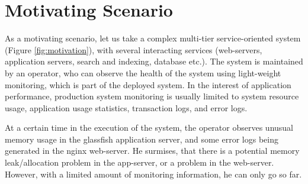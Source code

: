 \section{Motivating Scenario}
\label{sec:motivation}

\noindent
As a motivating scenario, let us take a complex multi-tier service-oriented system (Figure \ref{fig:motivation}), with several interacting services (web-servers, application servers, search and indexing, database etc.). 
The system is maintained by an operator, who can observe the health of the system using light-weight monitoring, which is part of the deployed system.
In the interest of application performance, production system monitoring is usually limited to system resource usage, application usage statistics, transaction logs, and error logs.

At a certain time in the execution of the system, the operator observes unusual memory usage in the glassfish application server, and some error logs being generated in the nginx web-server. 
He surmises, that there is a potential memory leak/allocation problem in the app-server, or a problem in the web-server.
However, with a limited amount of monitoring information, he can only go so far.

\iffalse
user Joe who is an administrator for a multi-tiered system (see Figure \ref{fig:motivation}). 
Much like several administrators, Joe uses light-weight system instrumentation to get a high level statistical/health view of the system.
He observes an unusually high memory usage in the glassfish server for transaction type X, and some anomalous error logs in the associated nginx systems.
Under usual circumstances, the system would have to go down(depending on the severity of the problem), the problem debugged using offline analysis, and the system would be patched once the problem has been diagnosed. 
However often, it is difficult to find out the configuration of the system, and the user input which is causing this problem.
In modern large scale systems some errors may happen only at scale, and would require a large test-cluster to recreate the error.
Furthermore, taking down the glassfish and nginx servers would impact several more services otherwise are running fine. 
\fi

